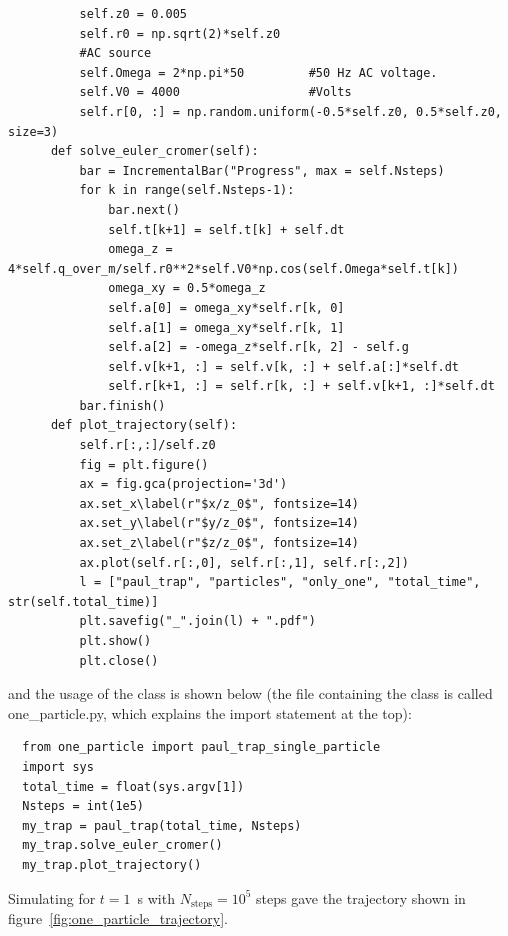 \documentclass[%
oneside,                 %
final,                   %
10pt]{article}
\newenvironment{doconceexercise}{}{}
\begin{document}
\begin{doconceexercise}
\begin{verbatim}
          self.z0 = 0.005
          self.r0 = np.sqrt(2)*self.z0
          #AC source
          self.Omega = 2*np.pi*50         #50 Hz AC voltage.
          self.V0 = 4000                  #Volts
          self.r[0, :] = np.random.uniform(-0.5*self.z0, 0.5*self.z0, size=3)
      def solve_euler_cromer(self):
          bar = IncrementalBar("Progress", max = self.Nsteps)
          for k in range(self.Nsteps-1):
              bar.next()
              self.t[k+1] = self.t[k] + self.dt
              omega_z = 4*self.q_over_m/self.r0**2*self.V0*np.cos(self.Omega*self.t[k])
              omega_xy = 0.5*omega_z
              self.a[0] = omega_xy*self.r[k, 0]
              self.a[1] = omega_xy*self.r[k, 1]
              self.a[2] = -omega_z*self.r[k, 2] - self.g
              self.v[k+1, :] = self.v[k, :] + self.a[:]*self.dt
              self.r[k+1, :] = self.r[k, :] + self.v[k+1, :]*self.dt
          bar.finish()
      def plot_trajectory(self):
          self.r[:,:]/self.z0
          fig = plt.figure()
          ax = fig.gca(projection='3d')
          ax.set_x\label(r"$x/z_0$", fontsize=14)
          ax.set_y\label(r"$y/z_0$", fontsize=14)
          ax.set_z\label(r"$z/z_0$", fontsize=14)
          ax.plot(self.r[:,0], self.r[:,1], self.r[:,2])
          l = ["paul_trap", "particles", "only_one", "total_time", str(self.total_time)]
          plt.savefig("_".join(l) + ".pdf")
          plt.show()
          plt.close()
\end{verbatim}
and the usage of the class is shown below (the file containing the class is called one\_particle.py, which explains the import statement at the top):
\begin{verbatim}
  from one_particle import paul_trap_single_particle
  import sys
  total_time = float(sys.argv[1])
  Nsteps = int(1e5)
  my_trap = paul_trap(total_time, Nsteps)
  my_trap.solve_euler_cromer()
  my_trap.plot_trajectory()
\end{verbatim}
Simulating for $t = 1$ s with $N_\text{steps} = 10^5$ steps gave the trajectory shown in figure~\ref{fig:one_particle_trajectory}.



\end{doconceexercise}
\end{document}
